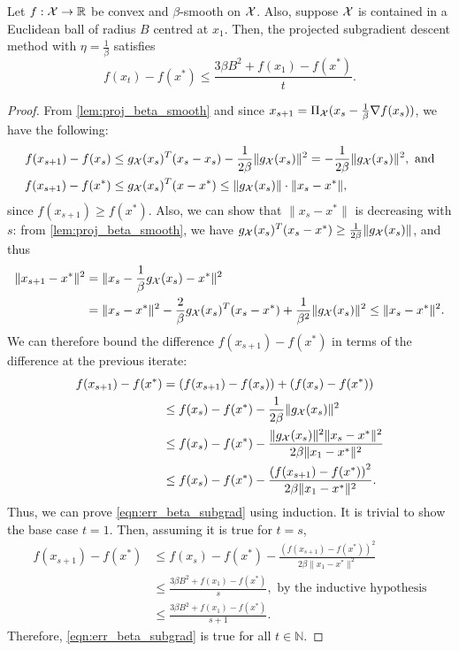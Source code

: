 \begin{theorem} Let $f : \mathcal{X} \rightarrow \mathbb{R}$ be convex and $\beta$-smooth on $\mathcal{X}$. Also, suppose $\mathcal{X}$ is contained in a Euclidean ball of radius $B$ centred at $x_1$. Then, the projected subgradient descent method with $\eta = \frac{1}{\beta}$ satisfies
\begin{equation} \label{eqn:err_beta_subgrad}
f(x_t) - f(x^*) \leq \frac{3 \beta B^2 + f(x_1) - f(x^*)}{t}.
\end{equation}
\begin{proof}
From \autoref{lem:proj_beta_smooth} and since $x_{s+1} = \Pi_{\mathcal{X}}(x_s - \frac{1}{\beta} \nabla f(x_s))$, we have the following:
\begin{align*}
f(x_{s+1}) - f(x_s) &\leq g_{\mathcal{X}}(x_s)^T(x_s - x_s) - \frac{1}{2 \beta} \| g_{\mathcal{X}}(x_s)\|^2 = - \frac{1}{2 \beta} \| g_{\mathcal{X}}(x_s)\|^2, \mbox{ and} \\
f(x_{s+1}) - f(x^*) &\leq g_{\mathcal{X}}(x_s)^T(x - x^*) \leq \|g_{\mathcal{X}}(x_s) \| \cdot \| x_s - x^* \|,
\end{align*}
since $f(x_{s+1}) \geq f(x^*)$. Also, we can show that $\|x_s - x^*\|$ is decreasing with $s$: from \autoref{lem:proj_beta_smooth}, we have $g_{\mathcal{X}}(x_s)^T(x_s - x^*) \geq \frac{1}{2\beta} \|g_{\mathcal{X}}(x_s)\|$, and thus
\begin{align*}
\|x_{s+1} - x^* \|^2 &= \|x_s - \frac{1}{\beta} g_{\mathcal{X}}(x_s) - x^*\|^2 \\
&= \|x_s - x^*\|^2 - \frac{2}{\beta}g_{\mathcal{X}}(x_s)^T(x_s - x^*) + \frac{1}{\beta^2}\|g_{\mathcal{X}}(x_s)\|^2 \leq \|x_s - x^*\|^2.
\end{align*}
We can therefore bound the difference $f(x_{s+1}) - f(x^*)$ in terms of the difference at the previous iterate:
\begin{align*}
f(x_{s+1}) - f(x^*) &= \left(f(x_{s+1}) - f(x_s)\right) + \left(f(x_s) - f(x^*)\right) \\
&\leq f(x_s) - f(x^*) - \frac{1}{2 \beta} \|g_{\mathcal{X}}(x_s)\|^2 \\
&\leq f(x_s) - f(x^*) - \frac{\|g_{\mathcal{X}}(x_s)\|^2 \|x_s - x^*\|^2}{2 \beta \|x_1 - x^*\|^2} \\
&\leq f(x_s) - f(x^*) - \frac{\left(f(x_{s+1}) - f(x^*)\right)^2}{2 \beta \|x_1 - x^*\|^2}.
\end{align*}
Thus, we can prove \eqref{eqn:err_beta_subgrad} using induction. It is trivial to show the base case $t=1$. Then, assuming it is true for $t = s$, 
\begin{align*}
f(x_{s+1}) - f(x^*) &\leq f(x_s) - f(x^*) - \frac{\left(f(x_{s+1}) - f(x^*)\right)^2}{2 \beta \|x_1 - x^*\|^2} \\
&\leq \frac{3 \beta B^2 + f(x_1) - f(x^*)}{s}, \mbox{ by the inductive hypothesis} \\
&\leq \frac{3 \beta B^2 + f(x_1) - f(x^*)}{s+1}.
\end{align*}
Therefore, \eqref{eqn:err_beta_subgrad} is true for all $t \in \mathbb{N}$. 
\end{proof}
\end{theorem}

